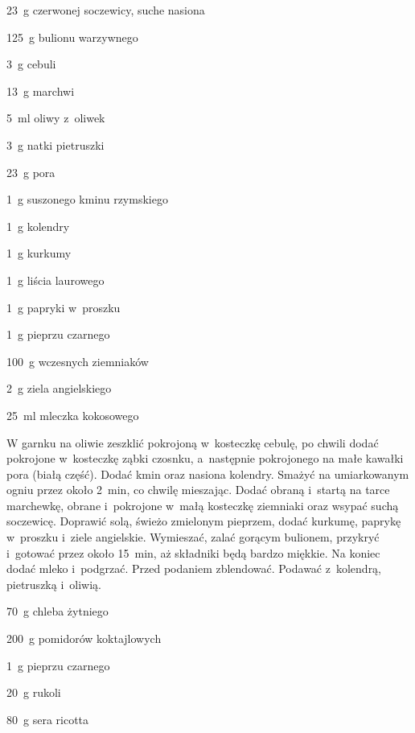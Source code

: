 \documentclass[../kucharek.tex]{subfiles}
\begin{document}
\begin{Ingred}
    \item \qty{23}{\gram} czerwonej soczewicy, suche nasiona
    \item \qty{125}{\gram} bulionu warzywnego
    \item \qty{3}{\gram} cebuli
    \item \qty{13}{\gram} marchwi
    \item \qty{5}{\milli\litre} oliwy z~oliwek
    \item \qty{3}{\gram} natki pietruszki
    \item \qty{23}{\gram} pora
    \item \qty{1}{\gram} suszonego kminu rzymskiego
    \item \qty{1}{\gram} kolendry
    \item \qty{1}{\gram} kurkumy
    \item \qty{1}{\gram} liścia laurowego
    \item \qty{1}{\gram} papryki w~proszku
    \item \qty{1}{\gram} pieprzu czarnego
    \item \qty{100}{\gram} wczesnych ziemniaków
    \item \qty{2}{\gram} ziela angielskiego
    \item \qty{25}{\milli\litre} mleczka kokosowego
\end{Ingred}

W garnku na oliwie zeszklić pokrojoną w~kosteczkę cebulę, po chwili dodać
pokrojone w~kosteczkę ząbki czosnku, a~następnie pokrojonego na małe kawałki
pora (białą część). Dodać kmin oraz nasiona kolendry. Smażyć na umiarkowanym
ogniu przez około \qty{2}{\minute}, co chwilę mieszając. Dodać obraną i~startą
na tarce marchewkę, obrane i~pokrojone w~małą kosteczkę ziemniaki oraz wsypać
suchą soczewicę. Doprawić solą, świeżo zmielonym pieprzem, dodać kurkumę,
paprykę w~proszku i~ziele angielskie. Wymieszać, zalać gorącym bulionem,
przykryć i~gotować przez około \qty{15}{\minute}, aż składniki będą bardzo
miękkie. Na koniec dodać mleko i~podgrzać. Przed podaniem zblendować. Podawać
z~kolendrą, pietruszką i~oliwią.


\begin{Ingred}
    \item \qty{70}{\gram} chleba żytniego
    \item \qty{200}{\gram} pomidorów koktajlowych
    \item \qty{1}{\gram} pieprzu czarnego
    \item \qty{20}{\gram} rukoli
    \item \qty{80}{\gram} sera ricotta
\end{Ingred}
\end{document}
